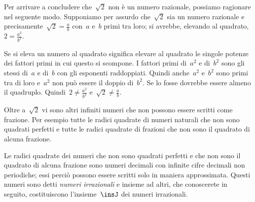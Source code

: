 Per arrivare a concludere che~\(\sqrt{2}\) non è un numero razionale,
possiamo ragionare nel seguente modo. Supponiamo per assurdo che~\(\sqrt{2}\)
sia un numero razionale e precisamente~\(\sqrt{2}=\frac{a}{b}\) con~\(a\) e~\(b\) 
primi tra loro; si avrebbe, elevando al quadrato, \(2=\frac{a^{2}}{b^{2}}\).

Se si eleva un numero al quadrato significa elevare al quadrato le
singole potenze dei fattori primi in cui questo si scompone. I fattori
primi di~\(a^{2}\) e di~\(b^{2}\) sono gli stessi di~\(a\) e di~\(b\) con
gli esponenti raddoppiati. Quindi anche~\(a^{2}\) e~\(b^{2}\)
sono primi tra di loro e~\(a^{2}\) non può essere il doppio di~\(b^{2}\).
Se lo fosse dovrebbe essere almeno il quadruplo. 
Quindi~\(2\ne\frac{a^{2}}{b^{2}}\) e~\(\sqrt{2}\ne\frac{a}{b}\).

Oltre a~\(\sqrt{2}\) vi sono altri infiniti numeri che non possono
essere scritti come frazione. Per esempio tutte le radici quadrate di
numeri naturali che non sono quadrati perfetti e tutte le radici
quadrate di frazioni che non sono il quadrato di alcuna frazione.

Le radici quadrate dei numeri che non sono quadrati perfetti e che non
sono il quadrato di alcuna frazione sono numeri decimali con infinite 
cifre decimali non periodiche; essi perciò possono essere scritti
solo in maniera approssimata. Questi numeri sono detti 
\emph{numeri irrazionali} e insieme ad altri, che conoscerete
in seguito, costituiscono l'insieme~\(\insJ\) dei numeri irrazionali.
